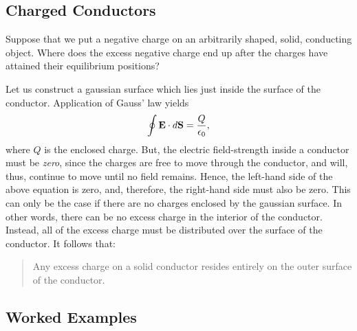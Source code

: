 \subsection{Charged Conductors}\label{szero}
Suppose that we put a negative charge on an arbitrarily shaped, solid,
conducting object. Where does the excess negative charge end up after the
charges have attained their equilibrium positions?

Let us construct a gaussian surface which lies just inside the surface
of the conductor. Application of Gauss' law yields
\begin{equation}
\oint {\bf E}\cdot d{\bf S} = \frac{Q}{\epsilon_0},
\end{equation}
where $Q$ is the enclosed charge.
But, the electric field-strength inside a conductor must be {\em zero}, since the
charges are free to move through the conductor, and will, thus, continue to move until no field remains. 
Hence, the left-hand side of the above equation is zero, and, therefore,
the right-hand side must also be zero. This can only be the case if there are
no charges enclosed by the gaussian surface. In other words, there can be no excess
charge in the interior of the conductor.
Instead, all of the excess charge must be distributed
over the surface of the conductor. It follows that:
\begin{quote}
{\sf Any excess charge on a solid conductor resides entirely
on the outer surface of the conductor.}
\end{quote}

\subsection{Worked Examples}
